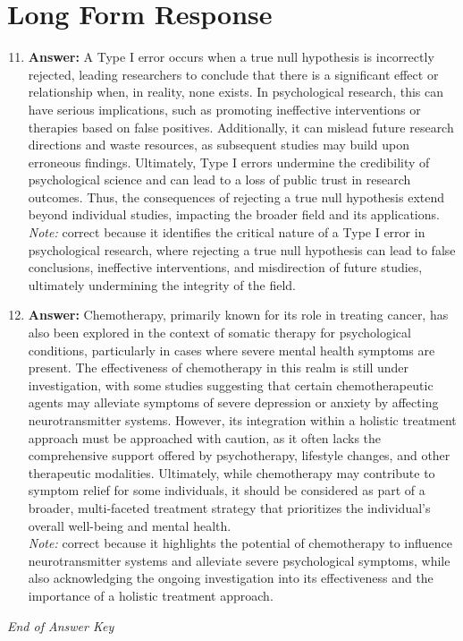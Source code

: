 \documentclass[12pt]{article}
\begin{document}
\section*{Long Form Response}
\begin{enumerate}[label=\arabic*.]
\setcounter{enumi}{10}
\item \textbf{Answer:} A Type I error occurs when a true null hypothesis is incorrectly rejected, leading researchers to conclude that there is a significant effect or relationship when, in reality, none exists. In psychological research, this can have serious implications, such as promoting ineffective interventions or therapies based on false positives. Additionally, it can mislead future research directions and waste resources, as subsequent studies may build upon erroneous findings. Ultimately, Type I errors undermine the credibility of psychological science and can lead to a loss of public trust in research outcomes. Thus, the consequences of rejecting a true null hypothesis extend beyond individual studies, impacting the broader field and its applications.
\\ \textit{Note:} correct because it identifies the critical nature of a Type I error in psychological research, where rejecting a true null hypothesis can lead to false conclusions, ineffective interventions, and misdirection of future studies, ultimately undermining the integrity of the field.
\item \textbf{Answer:} Chemotherapy, primarily known for its role in treating cancer, has also been explored in the context of somatic therapy for psychological conditions, particularly in cases where severe mental health symptoms are present. The effectiveness of chemotherapy in this realm is still under investigation, with some studies suggesting that certain chemotherapeutic agents may alleviate symptoms of severe depression or anxiety by affecting neurotransmitter systems. However, its integration within a holistic treatment approach must be approached with caution, as it often lacks the comprehensive support offered by psychotherapy, lifestyle changes, and other therapeutic modalities. Ultimately, while chemotherapy may contribute to symptom relief for some individuals, it should be considered as part of a broader, multi-faceted treatment strategy that prioritizes the individual's overall well-being and mental health.
\\ \textit{Note:} correct because it highlights the potential of chemotherapy to influence neurotransmitter systems and alleviate severe psychological symptoms, while also acknowledging the ongoing investigation into its effectiveness and the importance of a holistic treatment approach.
\end{enumerate}

\vfill
\noindent\textit{End of Answer Key}
\end{document}
